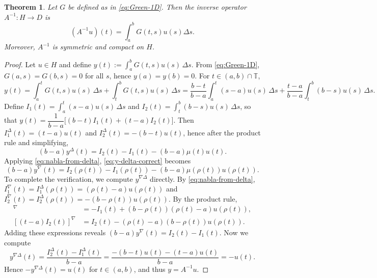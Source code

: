 \documentclass[10pt,a4paper]{amsart}
\newtheorem{theorem}{Theorem}
\begin{document}
\begin{theorem}\label{thm:A-inverse}
Let $G$ be defined as in \eqref{eq:Green-1D}. Then the inverse operator $A^{-1}\colon H \to D$ is
\begin{equation}\label{eq:A-inverse-rep}
\left(A^{-1}u\right)(t) = \int_a^b G(t,s) u(s) \Delta s.
\end{equation}
Moreover, $A^{-1}$ is symmetric and compact on $H$.
\end{theorem}

\begin{proof}
Let $u \in H$ and define $y(t) := \displaystyle\int_a^b G(t,s) u(s) \, \Delta s$. From \eqref{eq:Green-1D}, $G(a,s)=G(b,s)=0$ for all $s$, hence $y(a)=y(b)=0$. For $t\in(a,b)\cap\mathbb{T}$,
$$y(t) = \int_a^t G(t,s)u(s)\,\Delta s + \int_t^b G(t,s)u(s)\,\Delta s = \frac{b-t}{b-a}\int_a^t (s-a)u(s)\,\Delta s + \frac{t-a}{b-a}\int_t^b (b-s)u(s)\,\Delta s.$$
Define $I_1(t)=\displaystyle\int_a^t (s-a)u(s)\,\Delta s$ and $I_2(t)=\displaystyle\int_t^b (b-s)u(s)\,\Delta s$, so that $y(t)=\dfrac{1}{b-a}\Big[(b-t)I_1(t)+(t-a)I_2(t)\Big]$. Then $I_1^\Delta(t)=(t-a)u(t)$ and $I_2^\Delta(t)=-(b-t)u(t)$, hence after the product rule and simplifying,
\begin{equation}\label{eq:y-delta-correct}
(b-a)y^\Delta(t)=I_2(t)-I_1(t)-(b-a)\mu(t)u(t).
\end{equation}
Applying \eqref{eq:nabla-from-delta}, \eqref{eq:y-delta-correct} becomes
$$(b-a)y^\nabla(t) = I_2(\rho(t))-I_1(\rho(t))-(b-a)\mu(\rho(t))u(\rho(t)).$$
To complete the verification, we compute $y^{\nabla\Delta}$ directly. By \eqref{eq:nabla-from-delta}, $I_1^\nabla(t) = I_1^\Delta(\rho(t)) = (\rho(t)-a)u(\rho(t))$ and $I_2^\nabla(t) = I_2^\Delta(\rho(t)) = -(b-\rho(t))u(\rho(t))$. By the product rule,
\begin{align*}
[(b-t)I_1(t)]^\nabla &= -I_1(t) + (b-\rho(t))(\rho(t)-a)u(\rho(t)), \\
[(t-a)I_2(t)]^\nabla &= I_2(t) - (\rho(t)-a)(b-\rho(t))u(\rho(t)).
\end{align*}
Adding these expressions reveals $(b-a)y^\nabla(t) = I_2(t) - I_1(t)$. Now we compute
\[y^{\nabla\Delta}(t) = \dfrac{I_2^\Delta(t) - I_1^\Delta(t)}{b-a}=\frac{-(b-t)u(t) - (t-a)u(t)}{b-a}=-u(t).\]
Hence $-y^{\nabla\Delta}(t) = u(t)$ for $t \in (a,b)$, and thus $y = A^{-1}u$.


\end{proof}
\end{document}

